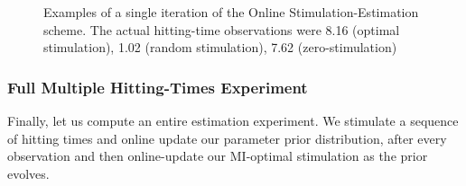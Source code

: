 \documentclass{article}
\begin{document}
\begin{figure}[h]
\begin{center} 
\caption[Effect of the First Observation on the Belief
Distribution]{Examples of a single iteration of the Online Stimulation-Estimation scheme.
The actual hitting-time observations were 8.16 (optimal stimulation), 1.02
(random stimulation), 7.62 (zero-stimulation) }
\label{fig:example_online_miopt_single_iteration}
\end{center}
\end{figure}  

\subsubsection{Full Multiple Hitting-Times Experiment}
Finally, let us compute an entire estimation experiment. We stimulate a sequence
of hitting times and online update our parameter prior distribution, after
every observation and then online-update our MI-optimal stimulation as the
prior evolves.

 
\end{document}
